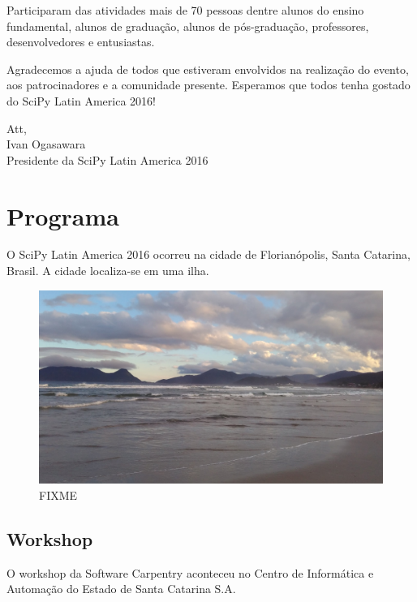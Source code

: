 \documentclass[12pt]{article}
\begin{document}
Participaram das atividades mais de 70 pessoas dentre
alunos do ensino fundamental,
alunos de graduação,
alunos de pós-graduação,
professores,
desenvolvedores
e entusiastas.

Agradecemos a ajuda de todos que estiveram envolvidos na realização do evento, aos patrocinadores e a comunidade presente. Esperamos que todos tenha gostado do SciPy Latin America 2016!


Att, \\
\indent Ivan Ogasawara \\
\indent Presidente da SciPy Latin America 2016


\clearpage
\newpage

\section*{Programa}

O SciPy Latin America 2016 ocorreu na cidade de Florianópolis, Santa Catarina,
Brasil. A cidade localiza-se em uma ilha.

\noindent  %
\begin{figure}[!htb]
\center
\includegraphics[height=.3\textheight]{venue-beach.jpg}
\caption{FIXME}
\end{figure}

\subsection*{Workshop}

O workshop da Software Carpentry aconteceu no Centro de Informática e Automação
do Estado de Santa Catarina S.A.
\end{document}
